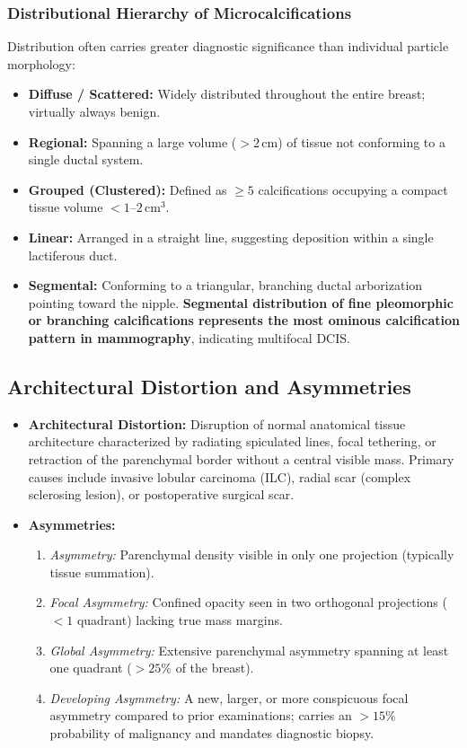 \documentclass[11pt,a4paper]{article}
\begin{document}
\subsubsection{Distributional Hierarchy of Microcalcifications}
Distribution often carries greater diagnostic significance than individual particle morphology:
\begin{itemize}[leftmargin=*]
    \item \textbf{Diffuse / Scattered:} Widely distributed throughout the entire breast; virtually always benign.
    \item \textbf{Regional:} Spanning a large volume ($> 2\,\text{cm}$) of tissue not conforming to a single ductal system.
    \item \textbf{Grouped (Clustered):} Defined as $\ge 5$ calcifications occupying a compact tissue volume $< 1\text{--}2\,\text{cm}^3$.
    \item \textbf{Linear:} Arranged in a straight line, suggesting deposition within a single lactiferous duct.
    \item \textbf{Segmental:} Conforming to a triangular, branching ductal arborization pointing toward the nipple. \textbf{Segmental distribution of fine pleomorphic or branching calcifications represents the most ominous calcification pattern in mammography}, indicating multifocal DCIS.
\end{itemize}

\subsection{Architectural Distortion and Asymmetries}

\begin{itemize}[leftmargin=*]
    \item \textbf{Architectural Distortion:} Disruption of normal anatomical tissue architecture characterized by radiating spiculated lines, focal tethering, or retraction of the parenchymal border without a central visible mass. Primary causes include invasive lobular carcinoma (ILC), radial scar (complex sclerosing lesion), or postoperative surgical scar.
    \item \textbf{Asymmetries:}
    \begin{enumerate}
        \item \textit{Asymmetry:} Parenchymal density visible in only one projection (typically tissue summation).
        \item \textit{Focal Asymmetry:} Confined opacity seen in two orthogonal projections ($< 1$ quadrant) lacking true mass margins.
        \item \textit{Global Asymmetry:} Extensive parenchymal asymmetry spanning at least one quadrant ($> 25\%$ of the breast).
        \item \textit{Developing Asymmetry:} A new, larger, or more conspicuous focal asymmetry compared to prior examinations; carries an $> 15\%$ probability of malignancy and mandates diagnostic biopsy.
    \end{enumerate}
\end{itemize}
\end{document}

